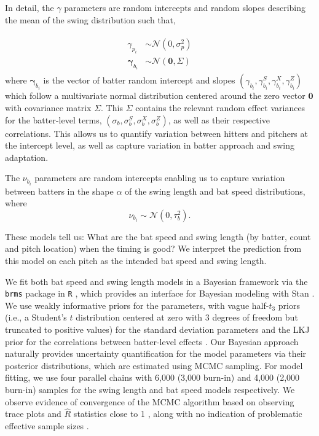 \documentclass{article}
\begin{document}
    In detail, the $\gamma$ parameters are random intercepts and random slopes describing the mean of the swing distribution such that,

    \begin{align}
        \begin{split}
            \gamma_{p_i} &\sim \mathcal{N}(0, \sigma^2_p) \\
            \boldsymbol{\gamma}_{b_i} &\sim \mathcal{N}(\boldsymbol{0}, \Sigma)
        \end{split}
    \end{align}
    where $\boldsymbol{\gamma}_{b_i}$ is the vector of batter random intercept and slopes $(\gamma_{b_i}, \gamma^S_{b_i}, \gamma^X_{b_i}, \gamma^Z_{b_i})$ which follow a multivariate normal distribution centered around the zero vector $\boldsymbol{0}$ with covariance matrix $\Sigma$. This $\Sigma$ contains the relevant random effect variances for the batter-level terms, $(\sigma_b, \sigma_b^S, \sigma_b^X, \sigma_b^Z)$, as well as their respective correlations. This allows us to quantify variation between hitters and pitchers at the intercept level, as well as capture variation in batter approach and swing adaptation.
    
    The $\nu_{b_i}$ parameters are random intercepts enabling us to capture variation between batters in the shape $\alpha$ of the swing length and bat speed distributions, where
    \begin{equation}
        \nu_{b_i} \sim \mathcal{N}(0, \tau^2_b).
    \end{equation}

    These models tell us: What are the bat speed and swing length (by batter, count and pitch location) when the timing is good? We interpret the prediction from this model on each pitch as the intended bat speed and swing length.
    
    We fit both bat speed and swing length models in a Bayesian framework via the \texttt{brms} package in \texttt{R} \citep{brms}, which provides an interface for Bayesian modeling with Stan \citep{carpenter2017stan}. We use weakly informative priors for the parameters, with vague half-$t_3$ priors (i.e., a Student's $t$ distribution centered at zero with 3 degrees of freedom but truncated to positive values) for the standard deviation parameters \citep{gelman2006prior} and the LKJ prior for the correlations between batter-level effects \cite{lewandowski2009generating}. Our Bayesian approach naturally provides uncertainty quantification for the model parameters via their posterior distributions, which are estimated using MCMC sampling. For model fitting, we use four parallel chains with 6,000 (3,000 burn-in) and 4,000 (2,000 burn-in) samples for the swing length and bat speed models respectively. We observe evidence of convergence of the MCMC algorithm based on observing trace plots and $\hat{R}$ statistics close to 1 \citep{gelman1992inference, brooks1998general}, along with no indication of problematic effective sample sizes \citep{gelman2020bayesian}. 
    
\end{document}
